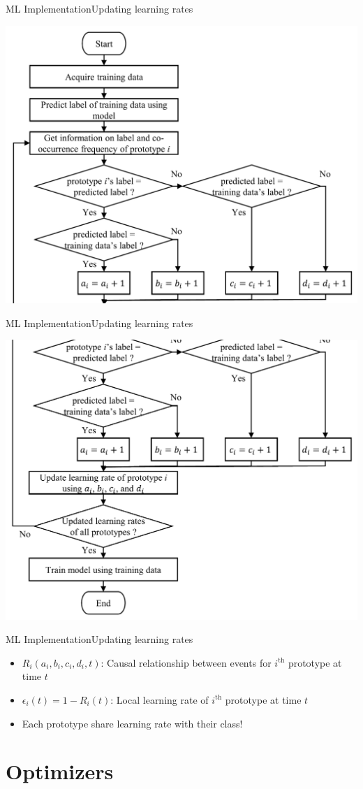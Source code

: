 \documentclass[
	aspectratio=169,	%
	onlytextwidth,		%
	t,					%
	]{beamer}
\begin{document}
	\begin{frame}[fragile]{ML Implementation}{Updating learning rates}
	
		\centering
				\includegraphics[width=.4\textwidth]{myfigs/lr flowchart1.png}
	\end{frame}

	\begin{frame}[fragile]{ML Implementation}{Updating learning rates}
	
		\centering
				\includegraphics[width=.4\textwidth]{myfigs/lr flowchart2.png}
	\end{frame}

	\begin{frame}[fragile]{ML Implementation}{Updating learning rates}
		\vfill
		\begin{itemize}
			\item<1->$R_{i}(a_{i},b_{i},c_{i},d_{i},t)$: Causal relationship between events for $i^{\text{th}}$ prototype at time $t$
			\item<2->$\epsilon_{i}(t) = 1- R_{i}(t)$: Local learning rate of $i^{\text{th}}$ prototype at time $t$
			\item <3-> Each prototype share learning rate with their class!
		\end{itemize}
		\vfill

	\end{frame}


	\section{Optimizers}
	
\end{document}
